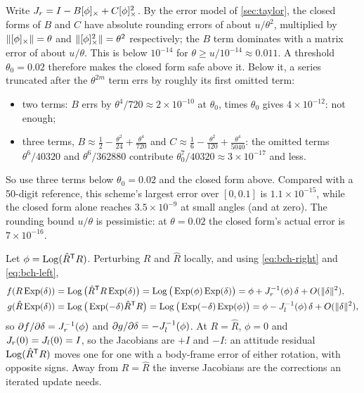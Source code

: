 \begin{solutions}
  \item Write $J_r = I - B[\phi]_{\times} + C[\phi]_{\times}^2$. By the error model of \cref{sec:taylor}, the closed forms of $B$ and $C$ have absolute rounding errors of
        about $u/\theta^2$, multiplied by $\|[\phi]_{\times}\| = \theta$ and $\|[\phi]_{\times}^2\| = \theta^2$ respectively; the $B$ term dominates with a matrix error of about
        $u/\theta$. This is below $10^{-14}$ for $\theta \ge u/10^{-14} \approx 0.011$. A threshold $\theta_0 = 0.02$ therefore makes the closed form safe
        above it. Below it, a series truncated after the $\theta^{2m}$ term errs by roughly its first omitted term:
        \begin{itemize}[leftmargin=1.2em]
          \item two terms: $B$ errs by $\theta^4/720 \approx 2\times10^{-10}$ at $\theta_0$, times $\theta_0$ gives $4\times10^{-12}$: not enough;
          \item three terms, $B \approx \tfrac12 - \tfrac{\theta^2}{24} + \tfrac{\theta^4}{720}$ and $C \approx \tfrac16 - \tfrac{\theta^2}{120} + \tfrac{\theta^4}{5040}$: the omitted terms
                $\theta^6/40320$ and $\theta^6/362880$ contribute $\theta_0^7/40320 \approx 3\times10^{-17}$ and less.
        \end{itemize}
        So use three terms below $\theta_0 = 0.02$ and the closed form above. Compared with a 50-digit reference, this scheme's largest error over
        $[0, 0.1]$ is $1.1\times10^{-15}$, while the closed form alone reaches $3.5\times10^{-9}$ at small angles (and  at zero). The rounding bound
        $u/\theta$ is pessimistic: at $\theta = 0.02$ the closed form's actual error is $7\times10^{-16}$.

  \item \ifsolutions
        Let $\phi = \operatorname{Log}(\hat R^{\mathsf{T}} R)$. Perturbing $R$ and $\hat R$ locally, and using \eqref{eq:bch-right} and \eqref{eq:bch-left},
        \begin{align*}
          f(R\operatorname{Exp}(\delta)) &= \operatorname{Log}\big(\hat R^{\mathsf{T}} R\operatorname{Exp}(\delta)\big) = \operatorname{Log}\big(\operatorname{Exp}(\phi)\operatorname{Exp}(\delta)\big) = \phi + J_r^{-1}(\phi)\,\delta + O(\|\delta\|^2), \\
          g(\hat R\operatorname{Exp}(\delta)) &= \operatorname{Log}\big(\operatorname{Exp}(-\delta)\hat R^{\mathsf{T}} R\big) = \operatorname{Log}\big(\operatorname{Exp}(-\delta)\operatorname{Exp}(\phi)\big) = \phi - J_l^{-1}(\phi)\,\delta + O(\|\delta\|^2),
        \end{align*}
        so $\partial f/\partial\delta = J_r^{-1}(\phi)$ and $\partial g/\partial\delta = -J_l^{-1}(\phi)$. At $R = \hat R$, $\phi = 0$ and $J_r(0) = J_l(0) = I$, so the Jacobians are $+I$ and $-I$: an attitude
        residual $\operatorname{Log}(\hat R^{\mathsf{T}} R)$ moves one for one with a body-frame error of either rotation, with opposite signs. Away from $R = \hat R$ the inverse
        Jacobians are the corrections an iterated update needs.
        \else\withheldsolution\fi


\end{solutions}
